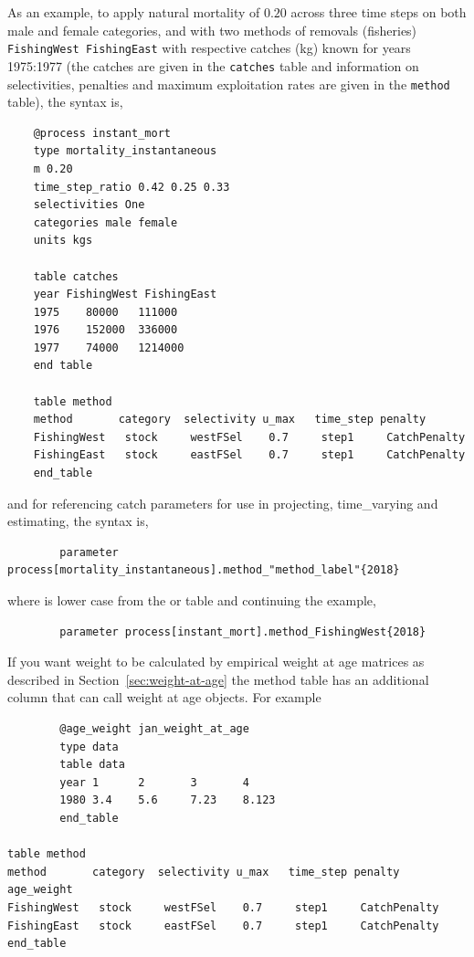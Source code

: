 As an example, to apply natural mortality of $0.20$ across three time steps on both male and female categories, and with two methods of removals (fisheries) \texttt{FishingWest FishingEast} with respective catches (kg) known for years 1975:1977 (the catches are given in the \texttt{catches} table and information on selectivities, penalties and maximum exploitation rates are given in the \texttt{method} table), the syntax is,

{\small{\begin{verbatim}
	@process instant_mort
	type mortality_instantaneous
	m 0.20
	time_step_ratio 0.42 0.25 0.33
	selectivities One
	categories male female
	units kgs

	table catches
	year FishingWest FishingEast
	1975	80000	111000
	1976	152000	336000
	1977	74000	1214000
	end table

	table method
	method       category  selectivity u_max   time_step penalty
	FishingWest   stock     westFSel    0.7     step1     CatchPenalty
	FishingEast   stock     eastFSel    0.7     step1     CatchPenalty
	end_table
	\end{verbatim}}}

and for referencing catch parameters for use in projecting, time\_varying and estimating, the syntax is,
{\small{\begin{verbatim}
		parameter process[mortality_instantaneous].method_"method_label"{2018}
		\end{verbatim}}}
	where  is lower case from the  or  table and continuing the example,

{\small{\begin{verbatim}
		parameter process[instant_mort].method_FishingWest{2018}
		\end{verbatim}}}

If you want weight to be calculated by empirical weight at age matrices as described in Section~\ref{sec:weight-at-age} the method table has an additional column that can call weight at age objects. For example

{\small{\begin{verbatim}
		@age_weight jan_weight_at_age
		type data
		table data
		year 1 		2 		3 		4
		1980 3.4	5.6		7.23 	8.123
		end_table

table method
method       category  selectivity u_max   time_step penalty 		age_weight
FishingWest   stock     westFSel    0.7     step1     CatchPenalty
FishingEast   stock     eastFSel    0.7     step1     CatchPenalty
end_table
\end{verbatim}}}


